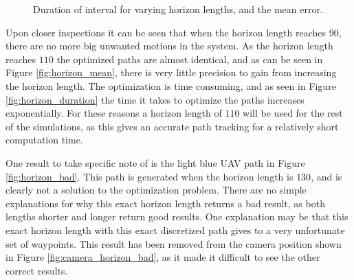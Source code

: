 \begin{figure}
	\caption{Duration of interval for varying horizon lengths, and the mean error.}
\end{figure}

Upon closer inspections it can be seen that when the horizon length reaches $90$, there are no more big unwanted motions in the system. As the horizon length reaches $110$ the optimized paths are almost identical, and as can be seen in Figure \ref{fig:horizon_mean}, there is very little precision to gain from increasing the horizon length. The optimization is time consuming, and as seen in Figure \ref{fig:horizon_duration} the time it takes to optimize the paths increases exponentially. For these reasons a horizon length of $110$ will be used for the rest of the simulations, as this gives an accurate path tracking for a relatively short computation time.

One result to take specific note of is the light blue UAV path in Figure \ref{fig:horizon_bad}. This path is generated when the horizon length is $130$, and is clearly not a solution to the optimization problem. There are no simple explanations for why this exact horizon length returns a bad result, as both lengths shorter and longer return good results. One explanation may be that this exact horizon length with this exact discretized path gives to a very unfortunate set of waypoints. This result has been removed from the camera position shown in Figure \ref{fig:camera_horizon_bad}, as it made it difficult to see the other correct results.